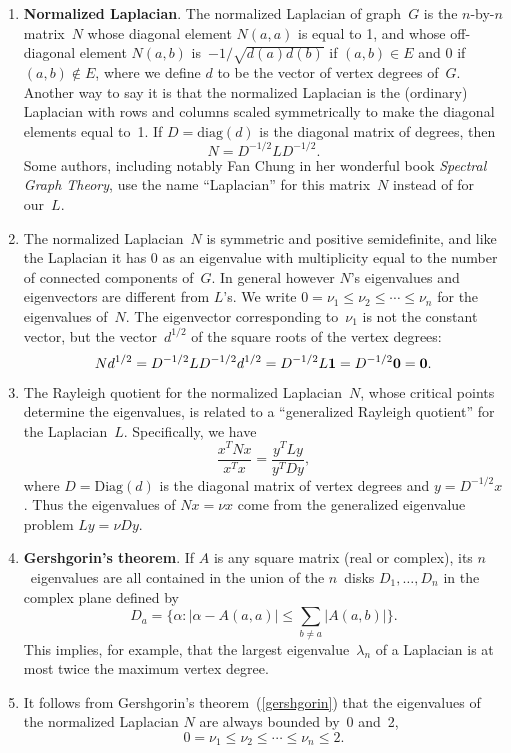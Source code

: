 \documentclass[11pt]{article}
\newcommand{\m}[1]{{\bf{#1}}}       %
\newcommand{\ones}{\m1}             %
\newcommand{\zeros}{\m0}            %
\newcommand{\diag}{\mbox{diag}}
\newcommand{\Diag}{\mbox{Diag}}
\begin{document}
\begin{enumerate}
\item\label{nlap}{\bf Normalized Laplacian}.
The normalized Laplacian of graph~$G$ is 
the $n$-by-$n$ matrix~$N$
whose diagonal element $N(a,a)$ is equal to 1,
and whose off-diagonal element $N(a,b)$ 
is~$-1/\sqrt{d(a)d(b)}$ if $(a,b) \in E$ and $0$ if $(a,b) \notin E$,
where we define $d$ to be the vector of vertex degrees of~$G$.
Another way to say it is that the normalized Laplacian is 
the (ordinary) Laplacian with rows and columns scaled symmetrically 
to make the diagonal elements equal to~1. 
If $D=\diag(d)$ is the diagonal matrix of degrees, 
then 
$$N = D^{-1/2}LD^{-1/2}.$$
Some authors, including notably Fan Chung in her 
wonderful book {\em Spectral Graph Theory}, 
use the name ``Laplacian'' for this matrix~$N$
instead of for our~$L$.

\item\label{nlapeig}
The normalized Laplacian~$N$ is symmetric and 
positive semidefinite, and like the Laplacian
it has 0 as an eigenvalue with multiplicity
equal to the number of connected components
of~$G$.  In general however $N$'s eigenvalues
and eigenvectors are different from $L$'s.
We write $0=\nu_1\leq \nu_2\leq \cdots\leq \nu_n$
for the eigenvalues of~$N$.
The eigenvector corresponding to~$\nu_1$ is
not the constant vector, but the vector~$d^{1/2}$
of the square roots of the vertex degrees:
$$Nd^{1/2} = D^{-1/2}LD^{-1/2}d^{1/2} = D^{-1/2}L\ones = D^{-1/2}\zeros = \zeros.$$

\item\label{nlaprq}
The Rayleigh quotient for the normalized Laplacian~$N$, 
whose critical points determine the eigenvalues,
is related to a ``generalized Rayleigh quotient'' for the Laplacian~$L$.
Specifically, we have
$$\frac{x^TNx}{x^Tx} = \frac{y^TLy}{y^TDy},$$
where $D=\Diag(d)$ is the diagonal matrix of vertex degrees 
and $y=D^{-1/2}x$.
Thus the eigenvalues of $Nx=\nu x$ come from
the generalized eigenvalue problem $Ly=\nu Dy.$

\item\label{gershgorin}{\bf Gershgorin's theorem}.
If $A$ is any square matrix (real or complex), its $n$~eigenvalues are all contained
in the union of the $n$~disks $D_1,\ldots,D_n$ in the complex plane defined by
$$D_a = \{\alpha : |\alpha-A(a,a)| \leq \sum_{b\neq a}|A(a,b)|\}.$$
This implies, for example, that the largest eigenvalue~$\lambda_n$ of a Laplacian
is at most twice the maximum vertex degree.

\item
It follows from Gershgorin's theorem~(\ref{gershgorin}) that
the eigenvalues of the normalized Laplacian $N$ are always bounded by~0 and~2,
$$0 = \nu_1 \leq \nu_2 \leq \cdots \leq \nu_n \leq 2.$$


\end{enumerate}
\end{document}

